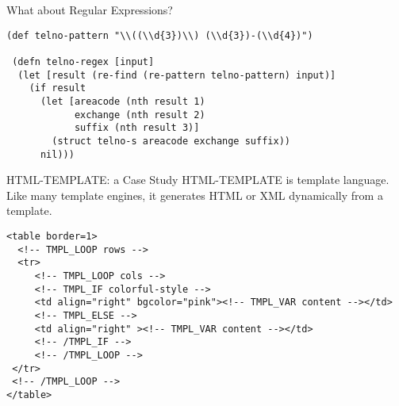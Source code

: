 \documentclass[presentation]{beamer}
\begin{document}
\begin{frame}[fragile]{What about Regular Expressions?}

\begin{verbatim}
(def telno-pattern "\\((\\d{3})\\) (\\d{3})-(\\d{4})")

 (defn telno-regex [input]
  (let [result (re-find (re-pattern telno-pattern) input)]
    (if result
      (let [areacode (nth result 1)
            exchange (nth result 2)
            suffix (nth result 3)]
        (struct telno-s areacode exchange suffix))
      nil)))
\end{verbatim}
\end{frame}

\begin{frame}[fragile]{HTML-TEMPLATE: a Case Study}
HTML-TEMPLATE is template language. Like many template engines, it
generates HTML or XML dynamically from a template.

\begin{verbatim}
<table border=1>
  <!-- TMPL_LOOP rows -->
  <tr>
     <!-- TMPL_LOOP cols -->
     <!-- TMPL_IF colorful-style -->
     <td align="right" bgcolor="pink"><!-- TMPL_VAR content --></td>
     <!-- TMPL_ELSE -->
     <td align="right" ><!-- TMPL_VAR content --></td>
     <!-- /TMPL_IF -->
     <!-- /TMPL_LOOP -->
 </tr>
 <!-- /TMPL_LOOP -->
</table>
\end{verbatim}

\end{frame}
\end{document}
